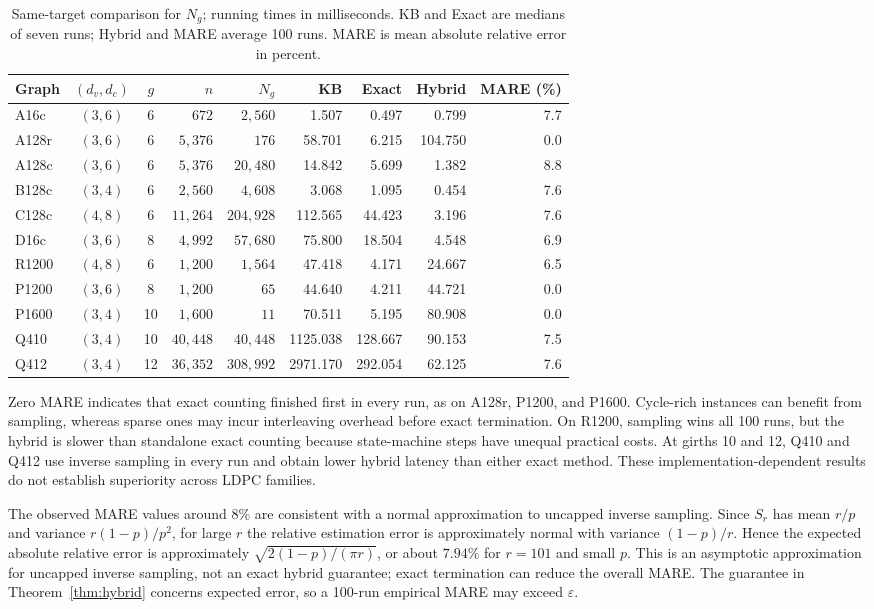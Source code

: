 \documentclass[conference]{IEEEtran}
\begin{document}
\begin{table}[t]
\centering
\caption{Same-target comparison for $N_g$; running times in milliseconds.
KB and Exact are medians of seven runs; Hybrid and MARE average 100 runs.
MARE is mean absolute relative error in percent.}
\label{tab:comparison-exp}
\footnotesize
\setlength{\tabcolsep}{5pt}
\begin{tabular}{lccrrrrrr}
\hline
Graph & $(d_v,d_c)$ & $g$ & $n$ & $N_g$
& KB & Exact & Hybrid & MARE (\%)\\
\hline
A16c & $(3,6)$ & 6 & $672$ & $2,560$ & 1.507 & 0.497 & 0.799 & 7.7\\
A128r & $(3,6)$ & 6 & $5,376$ & $176$ & 58.701 & 6.215 & 104.750 & 0.0\\
A128c & $(3,6)$ & 6 & $5,376$ & $20,480$ & 14.842 & 5.699 & 1.382 & 8.8\\
B128c & $(3,4)$ & 6 & $2,560$ & $4,608$ & 3.068 & 1.095 & 0.454 & 7.6\\
C128c & $(4,8)$ & 6 & $11,264$ & $204,928$ & 112.565 & 44.423 & 3.196 & 7.6\\
D16c & $(3,6)$ & 8 & $4,992$ & $57,680$ & 75.800 & 18.504 & 4.548 & 6.9\\
R1200 & $(4,8)$ & 6 & $1,200$ & $1,564$ & 47.418 & 4.171 & 24.667 & 6.5\\
P1200 & $(3,6)$ & 8 & $1,200$ & $65$ & 44.640 & 4.211 & 44.721 & 0.0\\
P1600 & $(3,4)$ & 10 & $1,600$ & $11$ & 70.511 & 5.195 & 80.908 & 0.0\\
Q410 & $(3,4)$ & 10 & $40,448$ & $40,448$ & 1125.038 & 128.667 & 90.153 & 7.5\\
Q412 & $(3,4)$ & 12 & $36,352$ & $308,992$ & 2971.170 & 292.054 & 62.125 & 7.6\\
\hline
\end{tabular}
\end{table}

Zero MARE indicates that exact counting finished first in every run,
as on A128r, P1200, and P1600. Cycle-rich instances can benefit
from sampling, whereas sparse ones may incur interleaving overhead
before exact termination. On R1200, sampling wins all 100 runs,
but the hybrid is slower than standalone exact counting because
state-machine steps have unequal practical costs. At girths 10
and 12, Q410 and Q412 use inverse sampling in every run and
obtain lower hybrid latency than either exact method. These
implementation-dependent results do not establish superiority
across LDPC families.

The observed MARE values around $8\%$ are consistent with a
normal approximation to uncapped inverse sampling. Since $S_r$
has mean $r/p$ and variance $r(1-p)/p^2$, for large $r$ the
relative estimation error is approximately normal with variance
$(1-p)/r$. Hence the expected absolute relative error is
approximately $\sqrt{2(1-p)/(\pi r)}$, or about $7.94\%$ for
$r=101$ and small $p$. This is an asymptotic approximation for
uncapped inverse sampling, not an exact hybrid guarantee;
exact termination can reduce the overall MARE. The guarantee
in Theorem~\ref{thm:hybrid} concerns expected error, so a
100-run empirical MARE may exceed $\varepsilon$.
\end{document}
